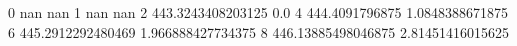 0 nan nan
1 nan nan
2 443.3243408203125 0.0
4 444.4091796875 1.0848388671875
6 445.2912292480469 1.966888427734375
8 446.13885498046875 2.81451416015625
